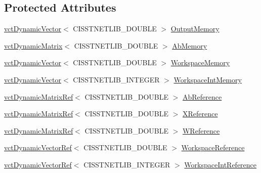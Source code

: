 \subsection*{Protected Attributes}
\begin{DoxyCompactItemize}
\item 
\hyperlink{classvct_dynamic_vector}{vct\+Dynamic\+Vector}$<$ C\+I\+S\+S\+T\+N\+E\+T\+L\+I\+B\+\_\+\+D\+O\+U\+B\+L\+E $>$ \hyperlink{classnmr_n_n_l_s_dynamic_data_ae6d19a42064425d263b7c9d06a53a9d3}{Output\+Memory}
\item 
\hyperlink{classvct_dynamic_matrix}{vct\+Dynamic\+Matrix}$<$ C\+I\+S\+S\+T\+N\+E\+T\+L\+I\+B\+\_\+\+D\+O\+U\+B\+L\+E $>$ \hyperlink{classnmr_n_n_l_s_dynamic_data_a56c98eb38d44c00e991ada79bf44126c}{Ab\+Memory}
\end{DoxyCompactItemize}
{\bf }\par
\begin{DoxyCompactItemize}
\item 
\hyperlink{classvct_dynamic_vector}{vct\+Dynamic\+Vector}$<$ C\+I\+S\+S\+T\+N\+E\+T\+L\+I\+B\+\_\+\+D\+O\+U\+B\+L\+E $>$ \hyperlink{classnmr_n_n_l_s_dynamic_data_ac03cc6fe1d222824ec55376cd45e74bb}{Workspace\+Memory}
\item 
\hyperlink{classvct_dynamic_vector}{vct\+Dynamic\+Vector}$<$ C\+I\+S\+S\+T\+N\+E\+T\+L\+I\+B\+\_\+\+I\+N\+T\+E\+G\+E\+R $>$ \hyperlink{classnmr_n_n_l_s_dynamic_data_a940c5f36f32ed750f145c40d9f505444}{Workspace\+Int\+Memory}
\end{DoxyCompactItemize}

{\bf }\par
\begin{DoxyCompactItemize}
\item 
\hyperlink{classvct_dynamic_matrix_ref}{vct\+Dynamic\+Matrix\+Ref}$<$ C\+I\+S\+S\+T\+N\+E\+T\+L\+I\+B\+\_\+\+D\+O\+U\+B\+L\+E $>$ \hyperlink{classnmr_n_n_l_s_dynamic_data_a4f8101cf60688294e18942fc6cfc697a}{Ab\+Reference}
\item 
\hyperlink{classvct_dynamic_matrix_ref}{vct\+Dynamic\+Matrix\+Ref}$<$ C\+I\+S\+S\+T\+N\+E\+T\+L\+I\+B\+\_\+\+D\+O\+U\+B\+L\+E $>$ \hyperlink{classnmr_n_n_l_s_dynamic_data_a84ad800513b0b1b9a910aeac150742d5}{X\+Reference}
\item 
\hyperlink{classvct_dynamic_matrix_ref}{vct\+Dynamic\+Matrix\+Ref}$<$ C\+I\+S\+S\+T\+N\+E\+T\+L\+I\+B\+\_\+\+D\+O\+U\+B\+L\+E $>$ \hyperlink{classnmr_n_n_l_s_dynamic_data_a0ba32ad64499bf28a292b08d49ee3210}{W\+Reference}
\item 
\hyperlink{classvct_dynamic_vector_ref}{vct\+Dynamic\+Vector\+Ref}$<$ C\+I\+S\+S\+T\+N\+E\+T\+L\+I\+B\+\_\+\+D\+O\+U\+B\+L\+E $>$ \hyperlink{classnmr_n_n_l_s_dynamic_data_a1fb3e39d83099e79b997175d044f2115}{Workspace\+Reference}
\item 
\hyperlink{classvct_dynamic_vector_ref}{vct\+Dynamic\+Vector\+Ref}$<$ C\+I\+S\+S\+T\+N\+E\+T\+L\+I\+B\+\_\+\+I\+N\+T\+E\+G\+E\+R $>$ \hyperlink{classnmr_n_n_l_s_dynamic_data_a34490c368a52327edc883f2dbe1a0ad5}{Workspace\+Int\+Reference}
\end{DoxyCompactItemize}

